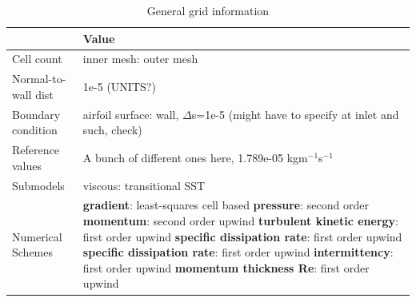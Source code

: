\begin{enumerate}
\begin{table}[H]
\caption{General grid information}
	\centering
	\begin{tabular}{|l|p{4.5in}|} \hline
				 & Value \\ \hline \hline
		Cell count & inner mesh: \newline outer mesh \\ \hline
		Normal-to-wall dist & 1e-5 (UNITS?) \\ \hline
		Boundary condition & airfoil surface: wall, $\Delta$s=1e-5 \newline (might have to specify at inlet and such, check) \\ \hline
		Reference values & A bunch of different ones here, 1.789e-05 kgm$^{-1}$s$^{-1}$ \\ \hline
		Submodels & viscous: transitional SST \\ \hline
		Numerical Schemes & \textbf{gradient}: least-squares cell based \newline \textbf{pressure}: second order \newline \textbf{momentum}: second order upwind \newline \textbf{turbulent kinetic energy}: first order upwind \newline \textbf{specific dissipation rate}: first order upwind \newline \textbf{specific dissipation rate}: first order upwind \newline \textbf{intermittency}: first order upwind \newline \textbf{momentum thickness Re}: first order upwind \\ \hline
	\end{tabular}
\end{table}



		
\end{enumerate}